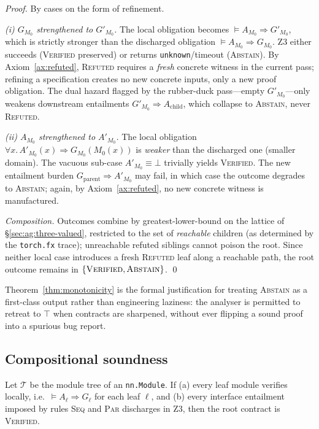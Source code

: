 \begin{proof}
By cases on the form of refinement.

\emph{(i) $G_{M_0}$ strengthened to $G'_{M_0}$.}
The local obligation becomes $\models A_{M_0}\Rightarrow G'_{M_0}$,
which is strictly stronger than the discharged obligation
$\models A_{M_0}\Rightarrow G_{M_0}$. Z3 either succeeds
(\textsc{Verified} preserved) or returns
\texttt{unknown}/timeout (\textsc{Abstain}). By
Axiom~\ref{ax:refuted}, \textsc{Refuted} requires a \emph{fresh}
concrete witness in the current pass; refining a specification creates
no new concrete inputs, only a new proof obligation. The dual hazard
flagged by the rubber-duck pass---empty $G'_{M_0}$---only weakens
downstream entailments $G'_{M_0}\!\Rightarrow\!A_{\text{child}}$, which
collapse to \textsc{Abstain}, never \textsc{Refuted}.

\emph{(ii) $A_{M_0}$ strengthened to $A'_{M_0}$.}
The local obligation $\forall x.\,A'_{M_0}(x)\!\Rightarrow\!G_{M_0}(M_0(x))$
is \emph{weaker} than the discharged one (smaller domain). The vacuous
sub-case $A'_{M_0}\equiv\bot$ trivially yields \textsc{Verified}. The
new entailment burden $G_{\text{parent}}\!\Rightarrow\!A'_{M_0}$ may
fail, in which case the outcome degrades to \textsc{Abstain}; again,
by Axiom~\ref{ax:refuted}, no new concrete witness is manufactured.

\emph{Composition.} Outcomes combine by greatest-lower-bound on the
lattice of \S\ref{sec:ag:three-valued}, restricted to the set of
\emph{reachable} children (as determined by the \texttt{torch.fx} trace);
unreachable refuted siblings cannot poison the root. Since neither
local case introduces a fresh \textsc{Refuted} leaf along a reachable
path, the root outcome remains in $\{\textsc{Verified},\textsc{Abstain}\}$.
\qed
\end{proof}

Theorem~\ref{thm:monotonicity} is the formal justification for treating
\textsc{Abstain} as a first-class output rather than engineering laziness:
the analyser is permitted to retreat to $\top$ when contracts are
sharpened, without ever flipping a sound proof into a spurious bug
report.

\subsection{Compositional soundness}
\label{sec:ag:soundness}

\begin{theorem}
\label{thm:soundness}
Let $\mathcal{T}$ be the module tree of an \texttt{nn.Module}. If
(a) every leaf module verifies locally, i.e.\
$\models A_\ell\Rightarrow G_\ell$ for each leaf $\ell$, and
(b) every interface entailment imposed by rules \textsc{Seq} and
\textsc{Par} discharges in Z3, then the root contract is
\textsc{Verified}.
\end{theorem}

